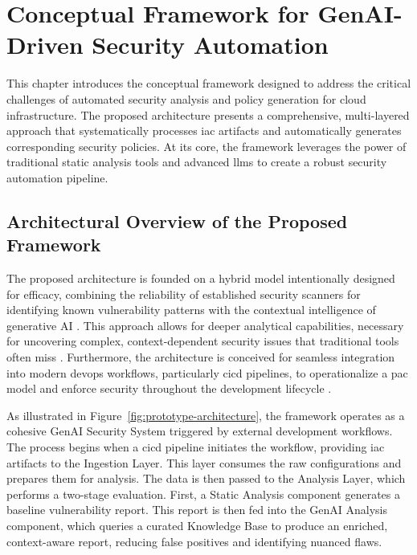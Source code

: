 \chapter{Conceptual Framework for GenAI-Driven Security Automation}
\label{chap:conceptual_framework}

This chapter introduces the conceptual framework designed to address the critical challenges of automated security analysis and policy generation for cloud infrastructure. The proposed architecture presents a comprehensive, multi-layered approach that systematically processes \gls{iac} artifacts and automatically generates corresponding security policies. At its core, the framework leverages the power of traditional static analysis tools and advanced \glspl{llm} to create a robust security automation pipeline.

\section{Architectural Overview of the Proposed Framework}
\label{sec:architectural-overview}

The proposed architecture is founded on a hybrid model intentionally designed for efficacy, combining the reliability of established security scanners for identifying known vulnerability patterns with the contextual intelligence of generative AI \cite{khanna_enhancing_2024}. This approach allows for deeper analytical capabilities, necessary for uncovering complex, context-dependent security issues that traditional tools often miss \cite{akiri_generative_2025}. Furthermore, the architecture is conceived for seamless integration into modern \gls{devops} workflows, particularly \gls{cicd} pipelines, to operationalize a \gls{pac} model and enforce security throughout the development lifecycle \cite{khanna_enhancing_2024}.

As illustrated in Figure~\ref{fig:prototype-architecture}, the framework operates as a cohesive GenAI Security System triggered by external development workflows. The process begins when a \gls{cicd} pipeline initiates the workflow, providing \gls{iac} artifacts to the Ingestion Layer. This layer consumes the raw configurations and prepares them for analysis. The data is then passed to the Analysis Layer, which performs a two-stage evaluation. First, a Static Analysis component generates a baseline vulnerability report. This report is then fed into the GenAI Analysis component, which queries a curated Knowledge Base to produce an enriched, context-aware report, reducing false positives and identifying nuanced flaws.

